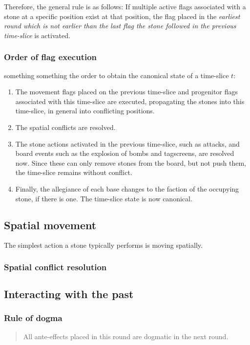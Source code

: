 \documentclass[12pt]{article}
\begin{document}
	
	Therefore, the general rule is as follows: If multiple active flags associated with a stone at a specific position exist at that position, the flag placed in the \textit{earliest round which is not earlier than the last flag the stone followed in the previous time-slice} is activated.
	
	\subsubsection{Order of flag execution}
	
	something something the order to obtain the canonical state of a time-slice $t$:
	\begin{enumerate}
		\item The movement flags placed on the previous time-slice and progenitor flags associated with this time-slice are executed, propagating the stones into this time-slice, in general into conflicting positions.
		\item The spatial conflicts are resolved.
		\item The stone actions activated in the previous time-slice, such as attacks, and board events such as the explosion of bombs and tagscreens, are resolved now. Since these can only remove stones from the board, but not push them, the time-slice remains without conflict.
		\item Finally, the allegiance of each base changes to the faction of the occupying stone, if there is one. The time-slice state is now canonical.
	\end{enumerate}
	
	\subsection{Spatial movement}
	The simplest action a stone typically performs is moving spatially.
	
	\subsubsection{Spatial conflict resolution}\label{sec:spatial conflict resolution}
	
	\subsection{Interacting with the past}
	
	\subsubsection{Rule of dogma}\label{sec:rule of dogma}
	\begin{quote}
	All ante-effects placed in this round are dogmatic in the next round.
	\end{quote}
	
\end{document}
